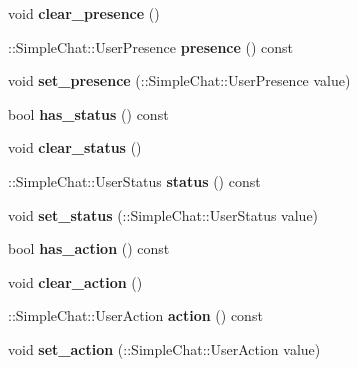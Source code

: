 \begin{DoxyCompactItemize}
\item 
\hypertarget{classSimpleChat_1_1UserChange_a6d4c1d5adf9d10d09c2a215bca19decd}{void {\bfseries clear\-\_\-presence} ()}\label{classSimpleChat_1_1UserChange_a6d4c1d5adf9d10d09c2a215bca19decd}

\item 
\hypertarget{classSimpleChat_1_1UserChange_a9df995ff3212974ad65334b16486c4de}{\-::Simple\-Chat\-::\-User\-Presence {\bfseries presence} () const }\label{classSimpleChat_1_1UserChange_a9df995ff3212974ad65334b16486c4de}

\item 
\hypertarget{classSimpleChat_1_1UserChange_a061d328b53eeed2086d667afd5c34c43}{void {\bfseries set\-\_\-presence} (\-::Simple\-Chat\-::\-User\-Presence value)}\label{classSimpleChat_1_1UserChange_a061d328b53eeed2086d667afd5c34c43}

\item 
\hypertarget{classSimpleChat_1_1UserChange_a51d4e503006e6c361c38ae0db740530c}{bool {\bfseries has\-\_\-status} () const }\label{classSimpleChat_1_1UserChange_a51d4e503006e6c361c38ae0db740530c}

\item 
\hypertarget{classSimpleChat_1_1UserChange_ab25d386a4151d5352cb4fe783293141e}{void {\bfseries clear\-\_\-status} ()}\label{classSimpleChat_1_1UserChange_ab25d386a4151d5352cb4fe783293141e}

\item 
\hypertarget{classSimpleChat_1_1UserChange_a229809d07c0488bfcc927c374ad3d2f3}{\-::Simple\-Chat\-::\-User\-Status {\bfseries status} () const }\label{classSimpleChat_1_1UserChange_a229809d07c0488bfcc927c374ad3d2f3}

\item 
\hypertarget{classSimpleChat_1_1UserChange_abd35c2735747ae1ee208e1fcfebf3a53}{void {\bfseries set\-\_\-status} (\-::Simple\-Chat\-::\-User\-Status value)}\label{classSimpleChat_1_1UserChange_abd35c2735747ae1ee208e1fcfebf3a53}

\item 
\hypertarget{classSimpleChat_1_1UserChange_aa14e02408e53e75828bbf600eee9517e}{bool {\bfseries has\-\_\-action} () const }\label{classSimpleChat_1_1UserChange_aa14e02408e53e75828bbf600eee9517e}

\item 
\hypertarget{classSimpleChat_1_1UserChange_ac9fd66ee13bf8b3c0466fba0bd5862bd}{void {\bfseries clear\-\_\-action} ()}\label{classSimpleChat_1_1UserChange_ac9fd66ee13bf8b3c0466fba0bd5862bd}

\item 
\hypertarget{classSimpleChat_1_1UserChange_ad99da53bd96d0940f8209944eb9d591d}{\-::Simple\-Chat\-::\-User\-Action {\bfseries action} () const }\label{classSimpleChat_1_1UserChange_ad99da53bd96d0940f8209944eb9d591d}

\item 
\hypertarget{classSimpleChat_1_1UserChange_ac507bea0770e9937914ce5edbdff7263}{void {\bfseries set\-\_\-action} (\-::Simple\-Chat\-::\-User\-Action value)}\label{classSimpleChat_1_1UserChange_ac507bea0770e9937914ce5edbdff7263}

\end{DoxyCompactItemize}
